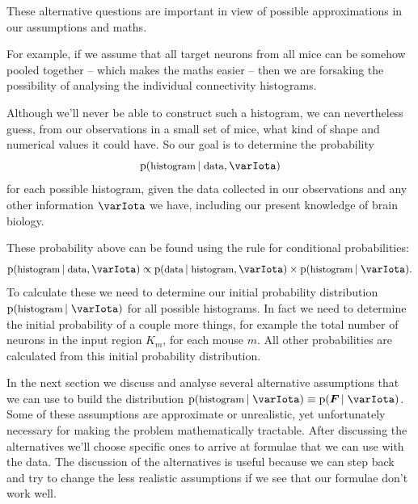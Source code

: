 \documentclass[\ifafour a4paper,12pt,\else a5paper,10pt,\fi%
onecolumn,oneside,article,%
british%
]{memoir}
\theoremstyle{remark}
\theoremstyle{innote}
\newcommand*{\pf}{\mathrm{p}}%
\renewcommand*{\|}[1][]{\nonscript\,#1\vert\nonscript\;\mathopen{}}
\newcommand*{\yI}{\varIota}
\newcommand*{\yF}{\bm{F}}
\begin{document}
\medskip

These alternative questions are important in view of possible
approximations in our assumptions and maths.



For example, if we assume that
all target neurons from all mice can be somehow pooled together -- which
makes the maths easier -- then we are forsaking the possibility of
analysing the individual connectivity histograms.

\medskip

Although we'll never be able to construct such a histogram, we can
nevertheless guess, from our observations in a small set of mice, what kind
of shape and numerical values it could have. So our goal is to determine
the probability
\begin{equation}
  \label{eq:prob_histogram_general}
  \pf(\text{\small histogram} \| \text{\small data}, \yI)
\end{equation}
for each possible histogram, given the data collected in our observations
and any other information $\yI$ we have, including our present knowledge of
brain biology.

These probability above can be found using the rule for conditional
probabilities:
\begin{equation}
  \label{eq:prob_histogram_bayes}
  \pf(\text{\small histogram} \| \text{\small data}, \yI)
  \propto
  \pf(\text{\small data} \| \text{\small histogram}, \yI)
  \times
  \pf(\text{\small histogram} \|  \yI).
\end{equation}
To calculate these we need to determine our initial probability
distribution $\pf(\text{\small histogram} \| \yI)$ for all possible
histograms. In fact we need to determine the initial probability of a
couple more things, for example the total number of neurons in the input
region $K_{m}$, for each mouse $m$. All other probabilities are calculated
from this initial probability distribution.

In the next section we discuss and analyse several alternative assumptions
that we can use to build the distribution
$\pf(\text{\small histogram} \| \yI) \equiv \pf(\yF \| \yI)$. Some of these
assumptions are approximate or unrealistic, yet unfortunately necessary for
making the problem mathematically tractable. After discussing the
alternatives we'll choose specific ones to arrive at formulae that we can
use with the data. The discussion of the alternatives is useful because we
can step back and try to change the less realistic assumptions if we see
that our formulae don't work well.
\end{document}
